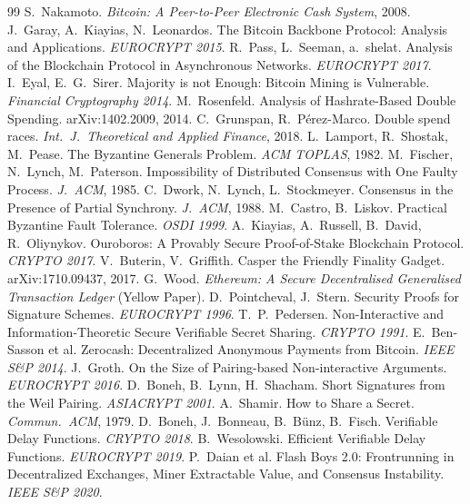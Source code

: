 \documentclass[11pt,a4paper]{article}
\theoremstyle{definition}
\theoremstyle{plain}
\theoremstyle{remark}
\begin{document}
\begin{thebibliography}{99}
 S.~Nakamoto. \emph{Bitcoin: A Peer-to-Peer Electronic Cash System}, 2008.
 J.~Garay, A.~Kiayias, N.~Leonardos. The Bitcoin Backbone Protocol: Analysis and Applications. \emph{EUROCRYPT 2015}.
 R.~Pass, L.~Seeman, a.~shelat. Analysis of the Blockchain Protocol in Asynchronous Networks. \emph{EUROCRYPT 2017}.
 I.~Eyal, E.~G.~Sirer. Majority is not Enough: Bitcoin Mining is Vulnerable. \emph{Financial Cryptography 2014}.
 M.~Rosenfeld. Analysis of Hashrate-Based Double Spending. arXiv:1402.2009, 2014.
 C.~Grunspan, R.~P\'erez-Marco. Double spend races. \emph{Int.\ J.\ Theoretical and Applied Finance}, 2018.
 L.~Lamport, R.~Shostak, M.~Pease. The Byzantine Generals Problem. \emph{ACM TOPLAS}, 1982.
 M.~Fischer, N.~Lynch, M.~Paterson. Impossibility of Distributed Consensus with One Faulty Process. \emph{J.\ ACM}, 1985.
 C.~Dwork, N.~Lynch, L.~Stockmeyer. Consensus in the Presence of Partial Synchrony. \emph{J.\ ACM}, 1988.
 M.~Castro, B.~Liskov. Practical Byzantine Fault Tolerance. \emph{OSDI 1999}.
 A.~Kiayias, A.~Russell, B.~David, R.~Oliynykov. Ouroboros: A Provably Secure Proof-of-Stake Blockchain Protocol. \emph{CRYPTO 2017}.
 V.~Buterin, V.~Griffith. Casper the Friendly Finality Gadget. arXiv:1710.09437, 2017.
 G.~Wood. \emph{Ethereum: A Secure Decentralised Generalised Transaction Ledger} (Yellow Paper).
 D.~Pointcheval, J.~Stern. Security Proofs for Signature Schemes. \emph{EUROCRYPT 1996}.
 T.~P.~Pedersen. Non-Interactive and Information-Theoretic Secure Verifiable Secret Sharing. \emph{CRYPTO 1991}.
 E.~Ben-Sasson et al. Zerocash: Decentralized Anonymous Payments from Bitcoin. \emph{IEEE S\&P 2014}.
 J.~Groth. On the Size of Pairing-based Non-interactive Arguments. \emph{EUROCRYPT 2016}.
 D.~Boneh, B.~Lynn, H.~Shacham. Short Signatures from the Weil Pairing. \emph{ASIACRYPT 2001}.
 A.~Shamir. How to Share a Secret. \emph{Commun.\ ACM}, 1979.
 D.~Boneh, J.~Bonneau, B.~B\"unz, B.~Fisch. Verifiable Delay Functions. \emph{CRYPTO 2018}.
 B.~Wesolowski. Efficient Verifiable Delay Functions. \emph{EUROCRYPT 2019}.
 P.~Daian et al. Flash Boys 2.0: Frontrunning in Decentralized Exchanges, Miner Extractable Value, and Consensus Instability. \emph{IEEE S\&P 2020}.

\end{thebibliography}
\end{document}
